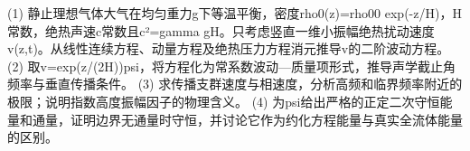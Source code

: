 (1) 静止理想气体大气在均匀重力g下等温平衡，密度rho0(z)=rho00 exp(-z/H)，H常数，绝热声速c常数且c²=gamma gH。只考虑竖直一维小振幅绝热扰动速度v(z,t)。从线性连续方程、动量方程及绝热压力方程消元推导v的二阶波动方程。
(2) 取v=exp(z/(2H))psi，将方程化为常系数波动—质量项形式，推导声学截止角频率与垂直传播条件。
(3) 求传播支群速度与相速度，分析高频和临界频率附近的极限；说明指数高度振幅因子的物理含义。
(4) 为psi给出严格的正定二次守恒能量和通量，证明边界无通量时守恒，并讨论它作为约化方程能量与真实全流体能量的区别。
